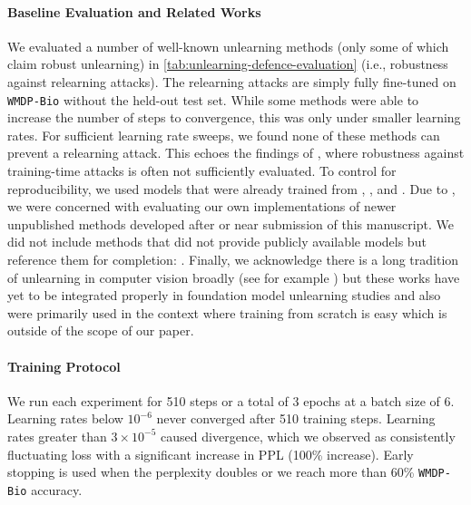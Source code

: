 \documentclass{article}
\theoremstyle{plain}
\theoremstyle{definition}
\theoremstyle{remark}
\begin{document}
\paragraph{Baseline Evaluation and Related Works}
We evaluated a number of well-known unlearning methods (only some of which claim robust unlearning) in \cref{tab:unlearning-defence-evaluation} (i.e., robustness against relearning attacks). The relearning attacks are simply fully fine-tuned on \texttt{WMDP-Bio} without the held-out test set. While some methods were able to increase the number of steps to convergence, this was only under smaller learning rates. For sufficient learning rate sweeps, we found none of these methods can prevent a relearning attack. This echoes the findings of \citet{qi2024evaluating}, where robustness against training-time attacks is often not sufficiently evaluated. To control for reproducibility, we used models that were already trained from \citet{fan2025llmunlearningresilientrelearning}, \citet{che2025model}, and \citet{o2025deep}. Due to \citet{qi2024evaluating}, we were concerned with evaluating our own implementations of newer unpublished methods developed after or near submission of this manuscript. We did not include methods that did not provide publicly available models but reference them for completion: \citep{sondej2025collapse,shilov2025beyond}. Finally, we acknowledge there is a long tradition of unlearning in computer vision broadly (see for example \citep{golatkar2019eternal}) but these works have yet to be integrated properly in foundation model unlearning studies and also were primarily used in the context where training from scratch is easy which is outside of the scope of our paper.

\paragraph{Training Protocol}
We run each experiment for 510 steps or a total of 3 epochs at a batch size of 6. Learning rates below $10^{-6}$ never converged after 510 training steps. Learning rates greater than $3 \times 10^{-5}$ caused divergence, which we observed as consistently fluctuating loss with a significant increase in PPL (100\% increase). Early stopping is used when the perplexity doubles or we reach more than 60\% \texttt{WMDP-Bio} accuracy.
\end{document}
